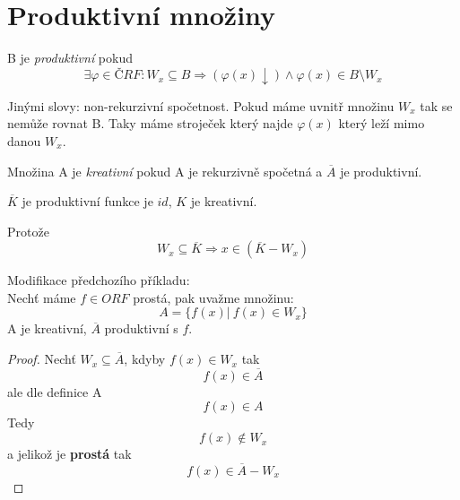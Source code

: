 \section{\texorpdfstring{Produktivní množiny}{Produktivní množiny}}
\vspace{5mm}
\large

\begin{definition}
	B je \emph{produktivní} pokud
	\[ \exists \varphi \in ČRF: W_x \subseteq B \Rightarrow (\varphi(x) \downarrow) \land \varphi(x) \in B \setminus W_x \]

	Jinými slovy: non-rekurzivní spočetnost. Pokud máme uvnitř množinu $W_x$ tak se nemůže rovnat B.
	Taky máme stroječek který najde $\varphi(x)$ který leží mimo danou $W_x$.
\end{definition}

\begin{definition}
	Množina A je \emph{kreativní} pokud A je rekurzivně spočetná a $\overline{A}$ je produktivní.
\end{definition}

\begin{example}[K]
	$\overline{K}$ je produktivní funkce je $id$, $K$ je kreativní.

	Protože
	\[ W_x \subseteq \overline{K} \Rightarrow x \in (\overline{K} - W_x) \]
\end{example}

\begin{theorem}[Modifikace K]
	Modifikace předchozího příkladu:\\
	Nechť máme $f \in ORF$ prostá, pak uvažme množinu:
	\[ A = \{ f(x)| \ f(x) \in W_x \} \]
	A je kreativní, $\overline{A}$ produktivní s $f$.
\end{theorem}
\begin{proof}
	Nechť $W_x \subseteq \overline{A}$, kdyby $f(x) \in W_x$ tak
	\[ f(x) \in \overline{A} \]
	ale dle definice A
	\[ f(x) \in A \]
	Tedy
	\[ f(x) \notin W_x \]
	a jelikož je \textbf{prostá} tak
	\[ f(x) \in \overline{A} - W_x \]
\end{proof}

